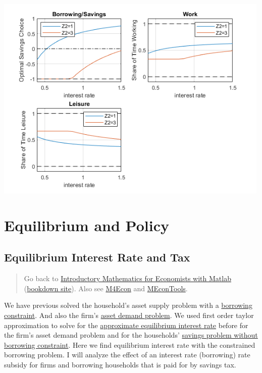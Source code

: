 \documentclass[
]{book}
\begin{document}
\includegraphics[width=5.20833in,height=\textheight]{img/household_asset_labor_constrained_images/figure_1.png}

\hypertarget{equilibrium-and-policy}{%
\chapter{Equilibrium and Policy}\label{equilibrium-and-policy}}

\hypertarget{equilibrium-interest-rate-and-tax}{%
\section{Equilibrium Interest Rate and Tax}\label{equilibrium-interest-rate-and-tax}}

\begin{quote}
Go back to \href{https://math4econ.github.io/}{Introductory Mathematics for Economists with Matlab} (\href{https://math4econ.github.io/bookdown}{bookdown site}). Also see \href{http://fanwangecon.github.io/M4Econ}{M4Econ} and \href{https://fanwangecon.github.io/MEconTools/}{MEconTools}.
\end{quote}

We have previous solved the household's asset supply problem with a
\href{https://math4econ.github.io/opti_hh_constrained_brsv_inequality/household_borrow_constrained.html}{borrowing
constraint}.
And also the firm's \href{https://math4econ.github.io/derivative_application/K_borrow_firm.html}{asset demand
problem}.
We used first order taylor approximation to solve for the \href{https://math4econ.github.io/matrix_application/demand_supply_taylor_approximate_capital.html}{approximate
equilibrium interest
rate}
before for the firm's asset demand problem and for the households'
\href{https://math4econ.github.io/derivative_application/K_save_households.html}{savings problem without borrowing
constraint}.
Here we find equilibrium interest rate with the constrained borrowing
problem. I will analyze the effect of an interest rate (borrowing) rate
subsidy for firms and borrowing households that is paid for by savings
tax.
\end{document}
